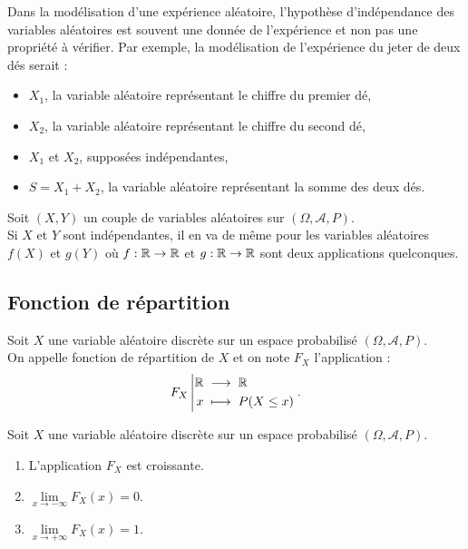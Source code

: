\documentclass{book}
\begin{document}
\begin{Remarque} Dans la modélisation d'une expérience aléatoire, l'hypothèse d'indépendance des variables aléatoires est souvent une donnée de l'expérience et 
non pas une propriété à vérifier. Par exemple, la modélisation de l'expérience du jeter de deux dés serait :
\begin{itemize}
\item $X_1$,  la variable aléatoire représentant le chiffre du premier dé,
\item $X_2$, la variable aléatoire représentant le chiffre du second dé,
\item $X_1$ et $X_2$, supposées indépendantes,
\item $S=X_1+X_2$, la variable aléatoire représentant la somme des deux dés.
\end{itemize}
\end{Remarque}

\begin{Theoreme}
Soit $(X,Y)$ un couple de variables aléatoires sur $(\Omega,\mathcal{A},P)$.\\
Si $X$ et $Y$ sont indépendantes, il en va de même pour les variables aléatoires $f(X)$ et $g(Y)$
où $f:\mathbb{R}\to \mathbb{R}$ et $g:\mathbb{R}\to \mathbb{R} $ sont deux applications quelconques.
\end{Theoreme}

\subsection{Fonction de répartition}
\begin{Definition}
Soit $X$ une variable aléatoire discrète sur un espace probabilisé $(\Omega,\mathcal{A},P)$.\\ 
On appelle fonction de
répartition de $X$ et on note $F_X$ l'application :
\[ {F_X}\left|\begin{aligned}{\mathbb{R}}&\;\longrightarrow\;{\mathbb{R}}\\{x}&\;\longmapsto\;{P(X\leq x)}\end{aligned}\right..\]
\end{Definition}


\begin{Definition}
Soit $X$ une variable aléatoire discrète sur un espace probabilisé $(\Omega,\mathcal{A},P)$.\\ 
\begin{enumerate}
\item L'application $F_X$ est croissante.
\item $\lim\limits_{x\to-\infty}F_X(x)=0$.
\item $\lim\limits_{x\to+\infty}F_X(x)=1$.
\end{enumerate}
\end{Definition}
\end{document}

